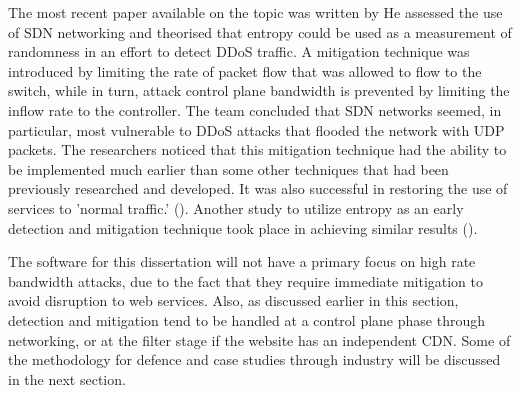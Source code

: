 The most recent paper available on the topic was written by \citeauthor{ahalawat2019entropy} He assessed the use of SDN networking and theorised that entropy could be used as a measurement of randomness in an effort to detect DDoS traffic. A mitigation technique was introduced by limiting the rate of packet flow that was allowed to flow to the switch, while in turn, attack control plane bandwidth is prevented by limiting the inflow rate to the controller.  The team concluded that SDN networks seemed, in particular, most vulnerable to DDoS attacks that flooded the network with UDP packets. The researchers noticed that this mitigation technique had the ability to be implemented much earlier than some other techniques that had been previously researched and developed. It was also successful in restoring the use of services to 'normal traffic.' (\cite{ahalawat2019entropy}). Another study to utilize entropy as an early detection and mitigation technique took place in \citeyear{kumar2018safety} achieving similar results (\cite{kumar2018safety}).

The software for this dissertation will not have a primary focus on high rate bandwidth attacks, due to the fact that they require immediate mitigation to avoid disruption to web services. Also, as discussed earlier in this section, detection and mitigation tend to be handled at a control plane phase through networking, or at the filter stage if the website has an independent CDN. Some of the methodology for defence and case studies through industry will be discussed in the next section.